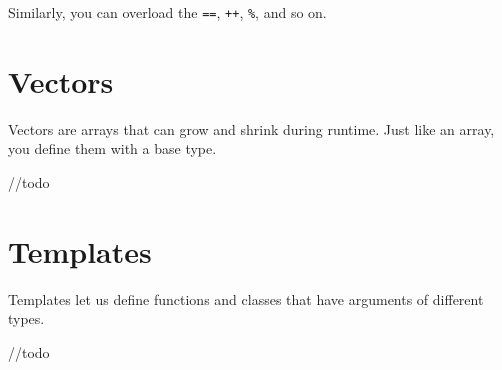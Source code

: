 \documentclass{IEEEtran}
\begin{document}
Similarly, you can overload the \verb|==|, \verb|++|, \verb|%|, and so on.




\section{Vectors}

Vectors are arrays that can grow and shrink during runtime. Just like an array, you define them with a base type.

//todo

\section{Templates}

Templates let us define functions and classes that have arguments of different types.

//todo






\end{document}
